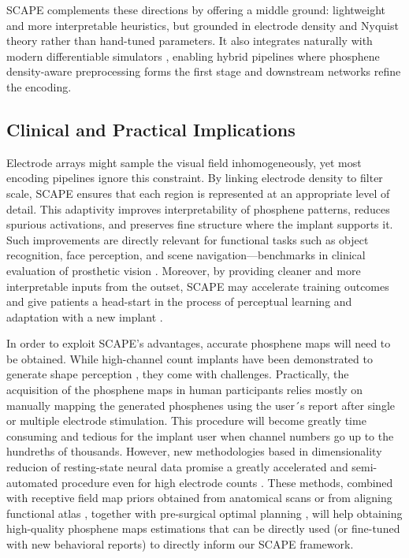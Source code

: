 SCAPE complements these directions by offering a middle ground: lightweight and more interpretable heuristics, but grounded in electrode density and Nyquist theory rather than hand-tuned parameters. It also integrates naturally with modern differentiable simulators \cite{vanderGrinten2024}, enabling hybrid pipelines where phosphene density-aware preprocessing forms the first stage and downstream networks refine the encoding.

\subsection{Clinical and Practical Implications}
Electrode arrays might sample the visual field inhomogeneously, yet most encoding pipelines ignore this constraint. By linking electrode density to filter scale, SCAPE ensures that each region is represented at an appropriate level of detail. This adaptivity improves interpretability of phosphene patterns, reduces spurious activations, and preserves fine structure where the implant supports it. Such improvements are directly relevant for functional tasks such as object recognition, face perception, and scene navigation—benchmarks in clinical evaluation of prosthetic vision \cite{Stingl2015,Fernandez2021}. Moreover, by providing cleaner and more interpretable inputs from the outset, SCAPE may accelerate training outcomes and give patients a head-start in the process of perceptual learning and adaptation with a new implant \cite{Normann2009, Beyeler2024}.

In order to exploit SCAPE's advantages, accurate phosphene maps will need to be obtained. While high-channel count implants have been demonstrated to generate shape perception \cite{Chen2020}, they come with challenges. Practically, the acquisition of the phosphene maps in human participants relies mostly on manually mapping the generated phosphenes using the user´s report after single or multiple electrode stimulation. This procedure will become greatly time consuming and tedious for the implant user when channel numbers go up to the hundreths of thousands. However, new methodologies based in dimensionality reducion of resting-state neural data promise a greatly accelerated and semi-automated procedure even for high electrode counts \cite{Lozano2024}. These methods, combined with receptive field map priors obtained from anatomical scans \cite{Benson2012, Ribeiro2021} or from aligning functional atlas \cite{Rosenke2021}, together with pre-surgical optimal planning \cite{vanHoof2025}, will help obtaining high-quality phosphene maps estimations that can be directly used (or fine-tuned with new behavioral reports) to directly inform our SCAPE framework.


